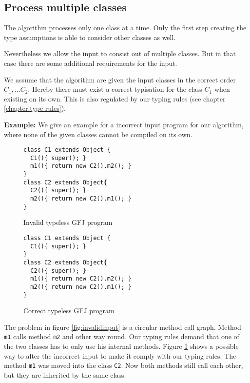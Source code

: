 \documentclass[runningheads]{llncs}
\begin{document}
\subsection{Process multiple classes}
The algorithm processes only one class at a time.
Only the first step creating the type assumptions is able to consider other classes as well.

Nevertheless we allow the input to consist out of multiple classes.
But in that case there are some additional requirements for the input.

We assume that the algorithm are given the input classes in the correct order $C_1, \ldots C_2$.
Hereby there must exist a correct typisation for the class $C_1$ when existing on its own.
This is also regulated by our typing rules (see chapter \ref{chapter:type-rules}).

\textbf{Example:}
We give an example for a incorrect input program for our algorithm, where none of the given classes cannot be compiled on its own.
  \begin{figure}
    \centering
    \begin{minipage}{.5\textwidth}
      \centering
      \begin{lstlisting}
class C1 extends Object {
  C1(){ super(); }
  m1(){ return new C2().m2(); }
}
class C2 extends Object{
  C2(){ super(); }
  m2(){ return new C2().m1(); }
}
          \end{lstlisting}
            \caption{Invalid typeless GFJ program}
      \label{fig:invalidinput}
    \end{minipage}%
    \begin{minipage}{.5\textwidth}
      \centering

    \begin{lstlisting}
class C1 extends Object {
  C1(){ super(); }
}
class C2 extends Object{
  C2(){ super(); }
  m1(){ return new C2().m2(); }
  m2(){ return new C2().m1(); }
}
            \end{lstlisting}
          \caption{Correct typeless GFJ program}
      \label{fig:correctinput}
    \end{minipage}
\end{figure}

The problem in figure \ref{fig:invalidinput} is a circular method call graph.
Method \texttt{m1} calls method \texttt{m2} and other way round.
Our typing rules demand that one of the two classes has to only use his internal methods.
Figure \ref{fig:correctinput} shows a possible way to alter the incorrect input to make it comply with our typing rules.
The method \texttt{m1} was moved into the class \texttt{C2}.
Now both methods still call each other, but they are inherited by the same class.
\end{document}
